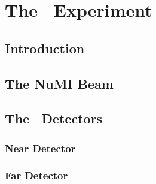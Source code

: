 \chapter{The \nova~Experiment}

\section{Introduction}

\section{The NuMI Beam}

\section{The \nova~Detectors}

\subsection{Near Detector}

\subsection{Far Detector}